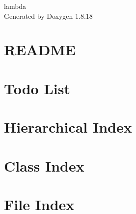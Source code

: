 \let\mypdfximage\pdfximage\def\pdfximage{\immediate\mypdfximage}\documentclass[twoside]{book}
\newcommand{\+}{\discretionary{\mbox{\scriptsize$\hookleftarrow$}}{}{}}
\newcommand{\clearemptydoublepage}{%
  \newpage{\pagestyle{empty}\cleardoublepage}%
}
\begin{document}
\hypersetup{pageanchor=false,
             bookmarksnumbered=true,
             pdfencoding=unicode
            }
\begin{titlepage}
\vspace*{7cm}
\begin{center}%
{\Large lambda }\\
\vspace*{1cm}
{\large Generated by Doxygen 1.8.18}\\
\end{center}
\end{titlepage}
\clearemptydoublepage
{}
\tableofcontents
\clearemptydoublepage
{}
\hypersetup{pageanchor=true}

\chapter{R\+E\+A\+D\+ME}
\label{md_lambda_src_README}

\chapter{Todo List}
\label{todo}

\chapter{Hierarchical Index}

\chapter{Class Index}

\chapter{File Index}

\end{document}
